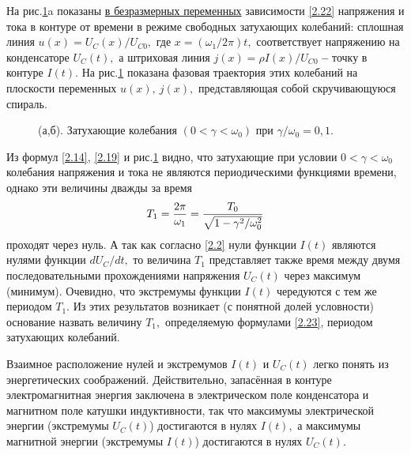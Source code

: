 На рис.\ref{fig2}a показаны \underline{в безразмерных переменных} зависимости \eqref{2.22} напряжения и тока в контуре от времени в режиме свободных затухающих колебаний: сплошная линия $u(x)=U_C(x)/U_{C0},$ где $x=(\omega_1/2\pi)t,$ соответствует напряжению на конденсаторе $U_C(t),$ а штриховая линия $j(x)=\rho I(x)/U_{C0}$ \textbf{--} точку в контуре $I(t).$ На рис.\ref{fig2} показана фазовая траектория этих колебаний на плоскости переменных   $u(x),~j(x),$ представляющая собой скручивающуюся спираль.

\begin{figure}[h]
	\begin{minipage}[h]{0.5\linewidth}
	\end{minipage}
	\hfill
	\begin{minipage}[h]{0.5\linewidth}
	\end{minipage}
	\caption{(а,б). Затухающие колебания $(0<\gamma<\omega_0)$ при $\gamma/\omega_0=0,1$.}
	\label{fig2}
\end{figure}

Из формул \eqref{2.14}, \eqref{2.19} и рис.\ref{fig2} видно, что затухающие при условии $0<\gamma<\omega_0$ колебания напряжения и тока не являются периодическими функциями времени, однако эти величины дважды за время
\begin{equation}\eqmark{2.23}
T_1=\dfrac{2\pi}{\omega_1}=\dfrac{T_0}{\sqrt{1-\gamma^2/\omega_0^2}}
\end{equation}
проходят через нуль. А так как согласно \eqref{2.2} нули функции $I(t)$ являются нулями функции $dU_C/dt,$ то величина $T_1$ представляет также время между двумя последовательными прохождениями напряжения $U_C(t)$ через максимум (минимум). Очевидно, что экстремумы функции $I(t)$ чередуются с тем же периодом $T_1.$ Из этих результатов возникает (с понятной долей условности) основание назвать  величину $T_1,$ определяемую формулами \eqref{2.23}, \textsf{периодом затухающих колебаний.}

Взаимное расположение нулей и экстремумов $I(t)$ и $U_C(t)$ легко понять из энергетических соображений. Действительно, запасённая в контуре электромагнитная энергия заключена в электрическом поле конденсатора и магнитном поле катушки индуктивности, так что максимумы электрической энергии (экстремумы $U_C(t)$) достигаются в нулях $I(t),$ а максимумы магнитной энергии (экстремумы $I(t)$) достигаются в нулях $U_C(t).$

